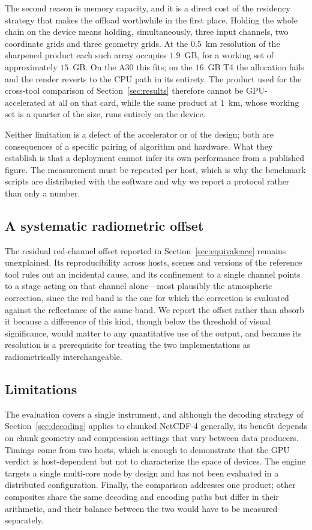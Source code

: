 \documentclass{ametsocV6.1}
\begin{document}
The second reason is memory capacity, and it is a direct cost of the residency
strategy that makes the offload worthwhile in the first place. Holding the
whole chain on the device means holding, simultaneously, three input channels,
two coordinate grids and three geometry grids. At the $0.5$~km resolution of
the sharpened product each such array occupies $1.9$~GB, for a working set of
approximately $15$~GB. On the A30 this fits; on the $16$~GB T4 the allocation
fails and the render reverts to the CPU path in its entirety. The product used
for the cross-tool comparison of Section~\ref{sec:results} therefore cannot be
GPU-accelerated at all on that card, while the same product at $1$~km, whose
working set is a quarter of the size, runs entirely on the device.

Neither limitation is a defect of the accelerator or of the design; both are
consequences of a specific pairing of algorithm and hardware. What they
establish is that a deployment cannot infer its own performance from a
published figure. The measurement must be repeated per host, which is why the
benchmark scripts are distributed with the software and why we report a
protocol rather than only a number.

\subsection{A systematic radiometric offset}
\label{sec:redbias}

The residual red-channel offset reported in Section~\ref{sec:equivalence}
remains unexplained. Its reproducibility across hosts, scenes and versions of
the reference tool rules out an incidental cause, and its confinement to a
single channel points to a stage acting on that channel alone---most plausibly
the atmospheric correction, since the red band is the one for which the
correction is evaluated against the reflectance of the same band. We report the
offset rather than absorb it because a difference of this kind, though below
the threshold of visual significance, would matter to any quantitative use of
the output, and because its resolution is a prerequisite for treating the two
implementations as radiometrically interchangeable.

\subsection{Limitations}
\label{sec:limitations}

The evaluation covers a single instrument, and although the decoding strategy
of Section~\ref{sec:decoding} applies to chunked NetCDF-4 generally, its
benefit depends on chunk geometry and compression settings that vary between
data producers. Timings come from two hosts, which is enough to demonstrate
that the GPU verdict is host-dependent but not to characterize the space of
devices. The engine targets a single multi-core node by design and has not been
evaluated in a distributed configuration. Finally, the comparison addresses one
product; other composites share the same decoding and encoding paths but
differ in their arithmetic, and their balance between the two would have to be
measured separately.
\end{document}

